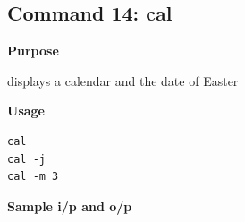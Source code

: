 \subsection{Command 14: cal} 
\textbf{Purpose}
\begin{flushleft}
 displays a calendar and the date of Easter
\end{flushleft}
\textbf{Usage}
\begin{verbatim}
cal
cal -j
cal -m 3
\end{verbatim}
\textbf{Sample i/p and o/p}
\begin{figure}[H] 
\end{figure}
